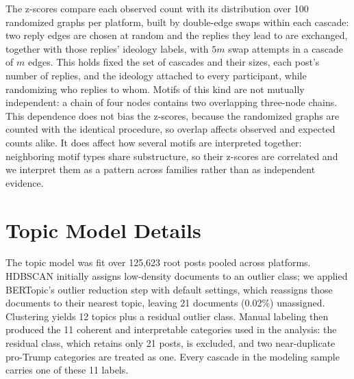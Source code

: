 \documentclass[letterpaper]{article} %
\newcommand{\rev}[1]{{\color{blue}#1}}
\begin{document}
\rev{The z-scores compare each observed count with its distribution over 100 randomized graphs per platform, built by double-edge swaps within each cascade: two reply edges are chosen at random and the replies they lead to are exchanged, together with those replies' ideology labels, with $5m$ swap attempts in a cascade of $m$ edges. This holds fixed the set of cascades and their sizes, each post's number of replies, and the ideology attached to every participant, while randomizing who replies to whom. Motifs of this kind are not mutually independent: a chain of four nodes contains two overlapping three-node chains. This dependence does not bias the z-scores, because the randomized graphs are counted with the identical procedure, so overlap affects observed and expected counts alike. It does affect how several motifs are interpreted together: neighboring motif types share substructure, so their z-scores are correlated and we interpret them as a pattern across families rather than as independent evidence.}

\section{\rev{Topic Model Details}}

\rev{The topic model was fit over 125,623 root posts pooled across platforms. HDBSCAN initially assigns low-density documents to an outlier class; we applied BERTopic's outlier reduction step with default settings, which reassigns those documents to their nearest topic, leaving 21 documents (0.02\%) unassigned. Clustering yields 12 topics plus a residual outlier class. Manual labeling then produced the 11 coherent and interpretable categories used in the analysis: the residual class, which retains only 21 posts, is excluded, and two near-duplicate pro-Trump categories are treated as one. Every cascade in the modeling sample carries one of these 11 labels.}
\end{document}
